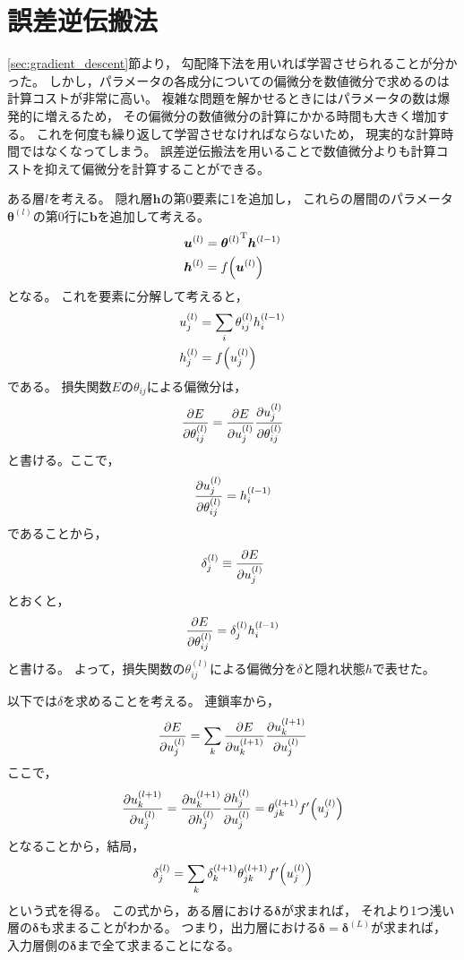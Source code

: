 \documentclass[class=jsarticle, crop=false, dvipdfmx, fleqn]{standalone}
\begin{document}
\section{誤差逆伝搬法}

\ref{sec:gradient_descent}節より，
勾配降下法を用いれば学習させられることが分かった。
しかし，パラメータの各成分についての偏微分を数値微分で求めるのは計算コストが非常に高い。
複雑な問題を解かせるときにはパラメータの数は爆発的に増えるため，
その偏微分の数値微分の計算にかかる時間も大きく増加する。
これを何度も繰り返して学習させなければならないため，
現実的な計算時間ではなくなってしまう。
誤差逆伝搬法を用いることで数値微分よりも計算コストを抑えて偏微分を計算することができる。

ある層$l$を考える。
隠れ層$\bm{h}$の第0要素に1を追加し，
これらの層間のパラメータ$\bm{\theta}^{(l)}$の第0行に$\bm{b}$を追加して考える。
\begin{align}
& \bm{u}^{(l)} = {\bm{\theta}^{(l)}}^{\mathrm{T}} \bm{h}^{(l-1)} \\
& \bm{h}^{(l)} = f\qty(\bm{u}^{(l)})
\end{align}
となる。
これを要素に分解して考えると，
\begin{align}
& u_j^{(l)} = \sum_i \theta_{ij}^{(l)} h_i^{(l-1)} \\
& h_j^{(l)} = f\qty(u_j^{(l)})
\end{align}
である。
損失関数$E$の$\theta_{ij}$による偏微分は，
\begin{equation}
\pdv{E}{\theta_{ij}^{(l)}} = \pdv{E}{u_j^{(l)}} \pdv{u_j^{(l)}}{\theta_{ij}^{(l)}}
\end{equation}
と書ける。ここで，
\begin{equation}
\pdv{u_j^{(l)}}{\theta_{ij}^{(l)}} = h_i^{(l-1)}
\end{equation}
であることから，
\begin{equation}
\delta_j^{(l)} \equiv \pdv{E}{u_j^{(l)}}
\label{eq:def:delta}
\end{equation}
とおくと，
\begin{equation}
\pdv{E}{\theta_{ij}^{(l)}} = \delta_j^{(l)} h_i^{(l-1)}
\label{eq:pdv_param}
\end{equation}
と書ける。
よって，損失関数の$\theta_{ij}^{(l)}$による偏微分を$\delta$と隠れ状態$h$で表せた。

以下では$\delta$を求めることを考える。
連鎖率から，
\begin{equation}
\pdv{E}{u_j^{(l)}} = \sum_k \pdv{E}{u_k^{(l+1)}} \pdv{u_k^{(l+1)}}{u_{j}^{(l)}}
\end{equation}
ここで，
\begin{equation}
\pdv{u_k^{(l+1)}}{u_{j}^{(l)}}
	= \pdv{u_k^{(l+1)}}{h_{j}^{(l)}} \pdv{h_j^{(l)}}{u_{j}^{(l)}}
	= \theta_{jk}^{(l+1)} f^\prime \qty(u_{j}^{(l)})
\end{equation}
となることから，結局，
\begin{equation}
\delta_j^{(l)} = \sum_k \delta_k^{(l+1)} \theta_{jk}^{(l+1)} f^\prime \qty(u_{j}^{(l)})
\label{eq:backprop_delta}
\end{equation}
という式を得る。
この式から，ある層における$\bm{\delta}$が求まれば，
それより1つ浅い層の$\bm{\delta}$も求まることがわかる。
つまり，出力層における$\bm{\delta} = \bm{\delta}^{(L)}$が求まれば，
入力層側の$\bm{\delta}$まで全て求まることになる。
\end{document}
